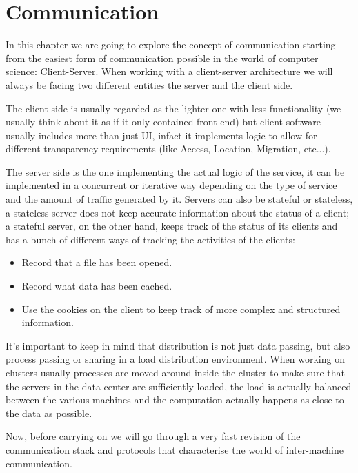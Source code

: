 \chapter{Communication}
In this chapter we are going to explore the concept of communication starting from the easiest form of communication possible in the world of computer science: Client-Server. When working with a client-server architecture we will always be facing two different entities the server and the client side.

The client side is usually regarded as the lighter one with less functionality (we usually think about it as if it only contained front-end) but client software usually includes more than just UI, infact it implements logic to allow for different transparency requirements (like Access, Location, Migration, etc...).

The server side is the one implementing the actual logic of the service, it can be implemented in a concurrent or iterative way depending on the type of service and the amount of traffic generated by it. Servers can also be stateful or stateless, a stateless server does not keep accurate information about the status of a client; a stateful server, on the other hand, keeps track of the status of its clients and has a bunch of different ways of tracking the activities of the clients:
\begin{itemize}
    \item Record that a file has been opened.
    \item Record what data has been cached.
    \item Use the cookies on the client to keep track of more complex and structured information.
\end{itemize}
It's important to keep in mind that distribution is not just data passing, but also process passing or sharing in a load distribution environment. When working on clusters usually processes are moved around inside the cluster to make sure that the servers in the data center are sufficiently loaded, the load is actually balanced between the various machines and the computation actually happens as close to the data as possible.

Now, before carrying on we will go through a very fast revision of the communication stack and protocols that characterise the world of inter-machine communication.

